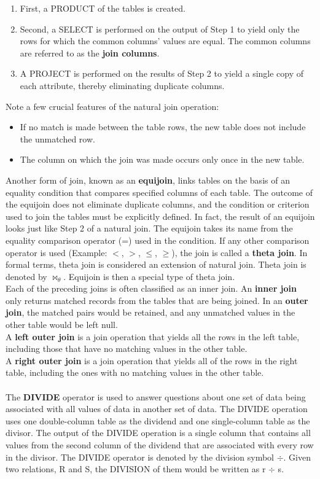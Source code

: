 \documentclass[a4paper, 12pt, titlepage]{report}
\begin{document}
{\begin{enumerate}
\item First, a PRODUCT of the tables is created.
\item Second, a SELECT is performed on the output of Step 1 to yield only the rows for
which the common columns' values are equal. The common columns are referred to as the \textbf{join columns}.
\item A PROJECT is performed on the results of Step 2 to yield a single copy of each attribute, thereby eliminating duplicate columns.
\end{enumerate}
Note a few crucial features of the natural join operation:
\begin{itemize}
\item If no match is made between the table rows, the new table does not include the unmatched row.
\item The column on which the join was made occurs only once in the new table.
\end{itemize}
Another form of join, known as an \textbf{equijoin}, links tables on the basis of an equality condition that compares specified columns of each table. The outcome of the equijoin does not eliminate duplicate columns, and the condition or criterion used to join the tables must be explicitly defined. In fact, the result of an equijoin looks just like Step 2 of a natural join. The equijoin takes its name from the equality comparison operator (=) used in the condition. If any other comparison operator is used (Example: $<$, $>$, $\leq$, $\geq$), the join is called a \textbf{theta join}. In formal terms, theta join is considered an extension of natural join. Theta join is denoted by $\bowtie_{\theta}$. Equijoin is then a special type of theta join.\\
Each of the preceding joins is often classified as an inner join. An \textbf{inner join} only returns matched records from the tables that are being joined. In an \textbf{outer join}, the matched pairs would be retained, and any unmatched values in the other table would be left null.\\
A \textbf{left outer join} is a join operation that yields all the rows in the left table, including those that have no matching values in the other table.\\
A \textbf{right outer join} is a join operation that yields all of the rows in the right table, including the ones with no matching values in the other table.\\ \\
The \textbf{DIVIDE} operator is used to answer questions about one set of data being associated with all values of data in another set of data. The DIVIDE operation uses one
double-column table as the dividend and one single-column table as the divisor. The output of the DIVIDE operation is a single column that contains all values from the second column of the dividend that are associated with every row in the divisor. The DIVIDE operator is denoted by the division symbol $\div$. Given two relations, R and S, the DIVISION of them would be written as r $\div$ s.
}
\end{document}
